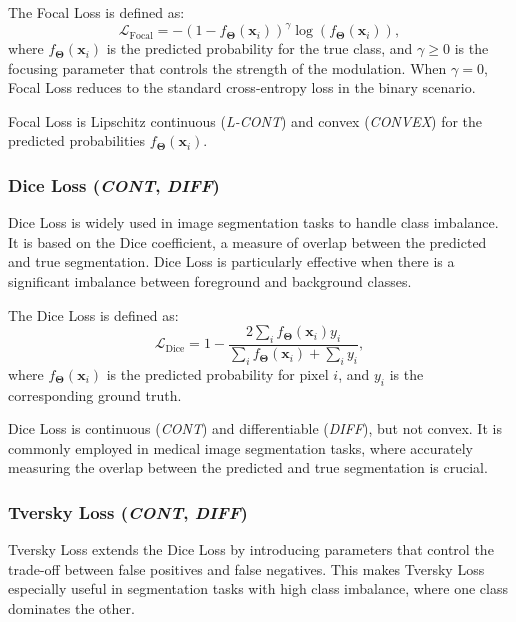 \documentclass[sn-mathphys-num]{sn-jnl}%
\newcommand \cont{\textit{CONT}}
\newcommand \lcont{\textit{L-CONT}}
\newcommand \diff{\textit{DIFF}}
\newcommand \conv{\textit{CONVEX}}
\renewcommand\vec{\mathbf}
\begin{document}
The Focal Loss is defined as:
\begin{equation}\label{eq:focal_loss}
    \mathcal{L}_{\text{Focal}} = - (1 - f_{\vec{\Theta}}(\mathbf{x}_i))^\gamma \log(f_{\vec{\Theta}}(\mathbf{x}_i)),
\end{equation}
where \( f_{\vec{\Theta}}(\mathbf{x}_i) \) is the predicted probability for the true class, and \( \gamma \geq 0 \) is the focusing parameter that controls the strength of the modulation. When \( \gamma = 0 \), Focal Loss reduces to the standard cross-entropy loss in the binary scenario.

Focal Loss is Lipschitz continuous (\lcont) and convex (\conv) for the predicted probabilities \( f_{\vec{\Theta}}(\mathbf{x}_i) \).

\subsubsection{Dice Loss (\cont, \diff)}\label{subsubsec-classification_dice_loss}
Dice Loss \cite{sudre2017generalised} is widely used in image segmentation tasks to handle class imbalance. It is based on the Dice coefficient, a measure of overlap between the predicted and true segmentation. Dice Loss is particularly effective when there is a significant imbalance between foreground and background classes.

The Dice Loss is defined as:
\begin{equation}\label{eq:dice_loss}
    \mathcal{L}_{\text{Dice}} = 1 - \frac{2 \sum_i f_{\vec{\Theta}}(\mathbf{x}_i) y_i}{\sum_i f_{\vec{\Theta}}(\mathbf{x}_i) + \sum_i y_i},
\end{equation}
where \( f_{\vec{\Theta}}(\mathbf{x}_i) \) is the predicted probability for pixel \( i \), and \( y_i \) is the corresponding ground truth.

Dice Loss is continuous (\cont) and differentiable (\diff), but not convex. It is commonly employed in medical image segmentation tasks, where accurately measuring the overlap between the predicted and true segmentation is crucial.

\subsubsection{Tversky Loss (\cont, \diff)}\label{subsubsec-classification_tversky_loss}
Tversky Loss \cite{salehi2017tversky} extends the Dice Loss by introducing parameters that control the trade-off between false positives and false negatives. This makes Tversky Loss especially useful in segmentation tasks with high class imbalance, where one class dominates the other.
\end{document}
